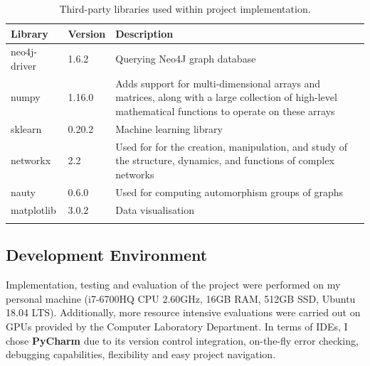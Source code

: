 \begin{longtable}{|p{}|p{}|p{}|}
  \hline
  \textbf{Library} & \textbf{Version} & \textbf{Description}                                                                                                                                  \\
  \hline
  neo4j-driver     & 1.6.2            & Querying Neo4J graph database                                                                                                                         \\

  numpy            & 1.16.0           & Adds support for multi-dimensional arrays and matrices, along with a large collection of high-level mathematical functions to operate on these arrays \\

  sklearn          & 0.20.2           & Machine learning library                                                                                                                              \\

  networkx         & 2.2              & Used for for the creation, manipulation, and study of the structure, dynamics, and functions of complex networks                                      \\
  nauty            & 0.6.0            & Used for computing automorphism groups of graphs                                                                                                      \\

  matplotlib       & 3.0.2            & Data visualisation                                                                                                                                    \\


  \hline
  \caption[Libraries]{Third-party libraries used within project implementation.}
  \label{Libraries}
\end{longtable} \bigskip

\subsection{Development Environment}

Implementation, testing and evaluation of the project were performed on my personal machine (i7-6700HQ CPU 2.60GHz, 16GB RAM, 512GB SSD,  Ubuntu 18.04 LTS). Additionally, more resource intensive evaluations were carried out on GPUs provided by the Computer Laboratory Department. In terms of IDEs, I chose \textbf{PyCharm} due to its version control integration, on-the-fly error checking, debugging capabilities, flexibility and easy project navigation. \\\

